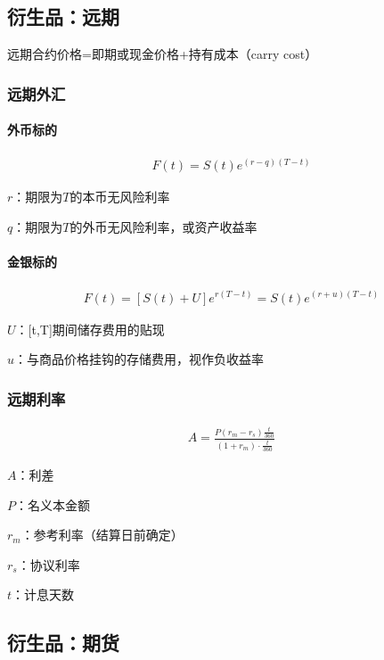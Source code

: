\documentclass[12pt]{book}
\begin{document}
\subsection{衍生品：远期}


远期合约价格=即期或现金价格+持有成本（carry cost）

\subsubsection{远期外汇}

\paragraph{外币标的}
\begin{gather*}
    F(t)=S(t) e^{(r-q)(T-t)}
\end{gather*}

\par $r$：期限为$T$的本币无风险利率
\par $q$：期限为$T$的外币无风险利率，或资产收益率

\paragraph{金银标的}
\begin{gather*}
  F(t)=[S(t)+U] e^{r(T-t)} 
      =S(t) e^{(r+u)(T-t)}
\end{gather*}
\par $U$：[t,T]期间储存费用的贴现
\par $u$：与商品价格挂钩的存储费用，视作负收益率  



\subsubsection{远期利率}
\begin{gather*}
    A=\frac{P(r_m-r_s)\frac{t}{360}}{(1+r_m)·\frac{t}{360}}
\end{gather*}
\par $A$：利差
\par $P$：名义本金额
\par $r_m$：参考利率（结算日前确定）
\par $r_s$：协议利率
\par $t$：计息天数






\subsection{衍生品：期货}
\end{document}
